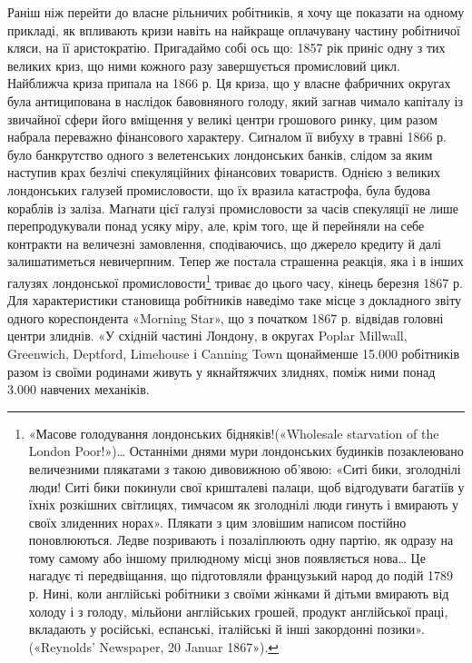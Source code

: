 Раніш ніж перейти до власне рільничих робітників, я хочу
ще показати на одному прикладі, як впливають кризи навіть на
найкраще оплачувану частину робітничої кляси, на її аристократію.
Пригадаймо собі ось що: 1857 рік приніс одну з тих
великих криз, що ними кожного разу завершується промисловий
цикл. Найближча криза припала на 1866 р. Ця криза, що у власне
фабричних округах була антиципована в наслідок бавовняного
голоду, який загнав чимало капіталу із звичайної сфери його
вміщення у великі центри грошового ринку, цим разом набрала
переважно фінансового характеру. Сиґналом її вибуху в травні
1866 р. було банкрутство одного з велетенських лондонських
банків, слідом за яким наступив крах безлічі спекуляційних
фінансових товариств. Однією з великих лондонських галузей
промисловости, що їх вразила катастрофа, була будова кораблів
із заліза. Маґнати цієї галузі промисловости за часів спекуляції
не лише перепродукували понад усяку міру, але, крім
того, ще й перейняли на себе контракти на величезні замовлення,
сподіваючись, що джерело кредиту й далі залишатиметься невичерпним.
Тепер же постала страшенна реакція, яка і в інших
галузях лондонської промисловости\footnote{
«Масове голодування лондонських бідняків!(«Wholesale starvation
of the London Poor!»)\dots{} Останніми днями мури лондонських будинків
позаклеювано величезними плякатами з такою дивовижною об’явою:
«Ситі бики, зголоднілі люди! Ситі бики покинули свої кришталеві
палаци, щоб відгодувати багатіїв у їхніх розкішних світлицях, тимчасом
як зголоднілі люди гинуть і вмирають у своїх злиденних норах». Плякати
з цим зловішим написом постійно поновлюються. Ледве позривають і
позаліплюють одну партію, як одразу на тому самому або іншому прилюдному
місці знов появляється нова\dots{} Це нагадує ті передвіщання, що підготовляли
французький народ до подій 1789 р. Нині, коли англійські
робітники з своїми жінками й дітьми вмирають від холоду і з голоду,
мільйони англійських грошей, продукт англійської праці, вкладають
у російські, еспанські, італійські й інші закордонні позики». («Reynolds'
Newspaper, 20 Januar 1867»).
} триває до цього часу,
кінець березня 1867 р. Для характеристики становища робітників
наведімо таке місце з докладного звіту одного кореспондента
«Morning Star», що з початком 1867 р. відвідав головні
центри злиднів. «У східній частині Лондону, в округах Poplar
Millwall, Greenwich, Deptford, Limehouse і Canning Town щонайменше
15.000 робітників разом із своїми родинами живуть у
якнайтяжчих злиднях, поміж ними понад 3.000 навчених механіків.
